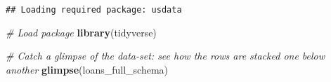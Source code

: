 \documentclass[
]{article}
\newenvironment{Shaded}{\begin{snugshade}}{\end{snugshade}}
\newcommand{\CommentTok}[1]{\textcolor[rgb]{0.56,0.35,0.01}{\textit{#1}}}
\newcommand{\FunctionTok}[1]{\textcolor[rgb]{0.13,0.29,0.53}{\textbf{#1}}}
\newcommand{\NormalTok}[1]{#1}
\begin{document}
\begin{verbatim}
## Loading required package: usdata
\end{verbatim}

\begin{Shaded}
\begin{Highlighting}[]
\CommentTok{\# Load package}
\FunctionTok{library}\NormalTok{(tidyverse)}
\end{Highlighting}
\end{Shaded}

\begin{Shaded}
\begin{Highlighting}[]
\CommentTok{\# Catch a glimpse of the data{-}set: see how the rows are stacked one below another}
\FunctionTok{glimpse}\NormalTok{(loans\_full\_schema)}
\end{Highlighting}
\end{Shaded}
\end{document}
